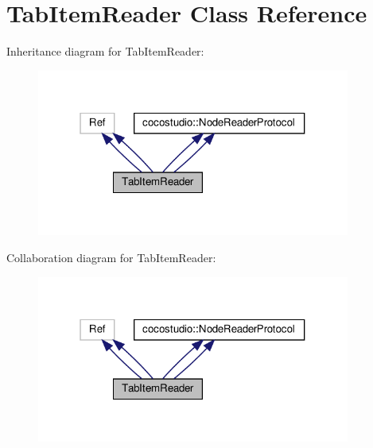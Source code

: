 \hypertarget{classTabItemReader}{}\section{Tab\+Item\+Reader Class Reference}
\label{classTabItemReader}


Inheritance diagram for Tab\+Item\+Reader\+:
\nopagebreak
\begin{figure}[H]
\begin{center}
\leavevmode
\includegraphics[width=292pt]{classTabItemReader__inherit__graph}
\end{center}
\end{figure}


Collaboration diagram for Tab\+Item\+Reader\+:
\nopagebreak
\begin{figure}[H]
\begin{center}
\leavevmode
\includegraphics[width=292pt]{classTabItemReader__coll__graph}
\end{center}
\end{figure}
